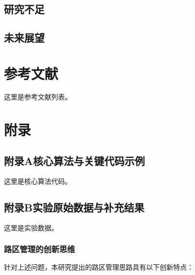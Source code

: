 \documentclass[12pt,a4paper,twoside]{ctexbook}
\let\oldchapter\chapter
\renewcommand{\chapter}{\clearpage\oldchapter}  %
\begin{document}
\section{研究不足}

\section{未来展望}




\chapter*{参考文献}
这里是参考文献列表。

\chapter*{附录}

\section*{附录A\quad 核心算法与关键代码示例}
这里是核心算法代码。

\section*{附录B\quad 实验原始数据与补充结果}
这里是实验数据。



\subsection{路区管理的创新思维}
针对上述问题，本研究提出的路区管理思路具有以下创新特点：
\end{document}

